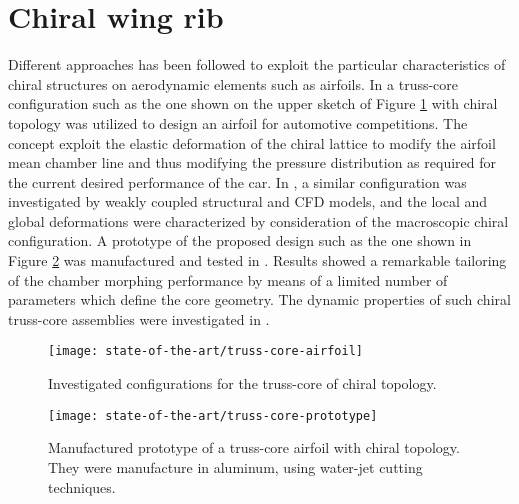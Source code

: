 \clearpage
\section{Chiral wing rib} \label{sec:wingRibChiral_state}

  Different approaches has been followed to exploit the particular characteristics of chiral structures on aerodynamic elements such as airfoils. In \cite{Bornengo2005} a truss-core configuration such as the one shown on the upper sketch of Figure \ref{fig:truss-core-airfoil} with chiral topology was utilized to design an airfoil for automotive competitions. The concept exploit the elastic deformation of the chiral lattice to modify the airfoil mean chamber line and thus modifying the pressure distribution as required for the current desired performance of the car. In \cite{Spadoni2007a}, a similar configuration was investigated by weakly coupled structural and CFD models, and the local and global deformations were characterized by consideration of the macroscopic chiral configuration. A prototype of the proposed design such as the one shown in Figure \ref{fig:truss-core-prototype} was manufactured and tested in \cite{Spadoni2007b}. Results showed a remarkable tailoring of the chamber morphing performance by means of a limited number of parameters which define the core geometry. The dynamic properties of such chiral truss-core assemblies were investigated in \cite{Spadoni2006}.

  \begin{figure}[!htpb]
    \centering
    \texttt{[image: state-of-the-art/truss-core-airfoil]}
    \caption[Investigated configurations for the truss-core of chiral topology]{Investigated configurations for the truss-core of chiral topology. \cite{Spadoni2007a}}\label{fig:truss-core-airfoil}
  \end{figure}

  \begin{figure}[!htpb]
    \centering
    \texttt{[image: state-of-the-art/truss-core-prototype]}
    \caption[Manufactured prototype of a truss-core airfoil with chiral topology]{Manufactured prototype of a truss-core airfoil with chiral topology. They were manufacture in aluminum, using water-jet cutting techniques. \cite{Spadoni2007b}}\label{fig:truss-core-prototype}
  \end{figure}


